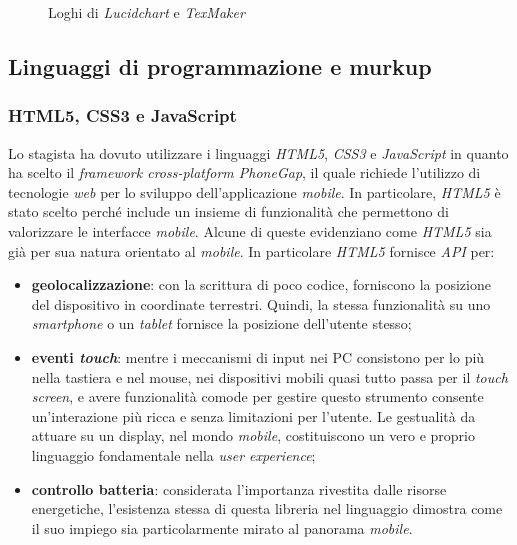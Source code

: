 \begin{figure}[!h] 
    \centering 
    \caption{Loghi di \textit{Lucidchart} e \textit{TexMaker}}
\end{figure}

\subsection{Linguaggi di programmazione e murkup}

\subsubsection{HTML5, CSS3 e JavaScript}

Lo stagista ha dovuto utilizzare i linguaggi \textit{HTML5}, \textit{CSS3} e \textit{JavaScript} in quanto ha scelto il \textit{framework cross-platform PhoneGap}, il quale richiede l'utilizzo di tecnologie \textit{web} per lo sviluppo dell'applicazione \textit{mobile}. In particolare, \textit{HTML5} è stato scelto perché include un insieme di funzionalità che permettono di valorizzare le interfacce \textit{mobile}. Alcune di queste evidenziano come \textit{HTML5} sia già per sua natura orientato al \textit{mobile}. In particolare \textit{HTML5} fornisce \textit{API} per:
\begin{itemize}
	\item \textbf{geolocalizzazione}: con la scrittura di poco codice, forniscono la posizione del dispositivo in coordinate terrestri. Quindi, la stessa funzionalità su uno \textit{smartphone} o un \textit{tablet} fornisce la posizione dell'utente stesso;
	\item \textbf{eventi \textit{touch}}: mentre i meccanismi di input nei PC consistono per lo più nella tastiera e nel mouse, nei dispositivi mobili quasi tutto passa per il \textit{touch screen}, e avere funzionalità comode per gestire questo strumento consente un'interazione più ricca e senza limitazioni per l'utente. Le gestualità da attuare su un display, nel mondo \textit{mobile}, costituiscono un vero e proprio linguaggio fondamentale nella \textit{user experience};
	\item \textbf{controllo batteria}: considerata l'importanza rivestita dalle risorse energetiche, l'esistenza stessa di questa libreria nel linguaggio dimostra come il suo impiego sia particolarmente mirato al panorama \textit{mobile}.
\end{itemize}

